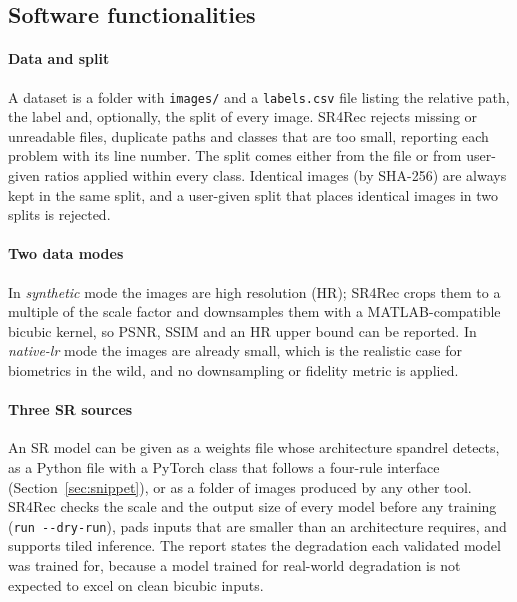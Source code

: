 \documentclass[preprint,12pt]{elsarticle}
\begin{document}
\subsection{Software functionalities}
\label{sec:functionalities}

\paragraph{Data and split} A dataset is a folder with \texttt{images/} and a \texttt{labels.csv} file
listing the relative path, the label and, optionally, the split of every image. SR4Rec rejects
missing or unreadable files, duplicate paths and classes that are too small, reporting each problem
with its line number. The split comes either from the file or from user-given ratios applied within
every class. Identical images (by SHA-256) are always kept in the same split, and a user-given split
that places identical images in two splits is rejected.

\paragraph{Two data modes} In \emph{synthetic} mode the images are high resolution (HR); SR4Rec
crops them to a multiple of the scale factor and downsamples them with a MATLAB-compatible bicubic
kernel, so PSNR, SSIM and an HR upper bound can be reported. In \emph{native-lr} mode the images
are already small, which is the realistic case for biometrics in the wild, and no downsampling or
fidelity metric is applied.

\paragraph{Three SR sources} An SR model can be given as a weights file whose architecture spandrel
detects, as a Python file with a PyTorch class that follows a four-rule interface
(Section~\ref{sec:snippet}), or as a folder of images produced by any other tool. SR4Rec checks the
scale and the output size of every model before any training (\texttt{run -{}-dry-run}), pads inputs
that are smaller than an architecture requires, and supports tiled inference. The report states the
degradation each validated model was trained for, because a model trained for real-world degradation
is not expected to excel on clean bicubic inputs.
\end{document}
